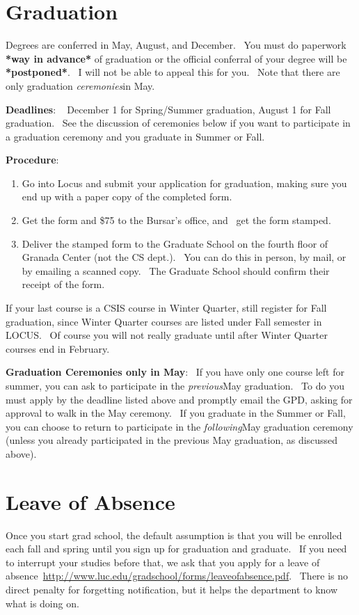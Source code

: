 \documentclass[letterpaper,10pt,english]{sphinxmanual}
\begin{document}
\section{Graduation}
\label{regulations:graduation}
Degrees are conferred in May, August, and December.  You must do
paperwork \textbf{*way in advance*} of graduation or the official conferral
of your degree will be \textbf{*postponed*}.  I will not be able to appeal
this for you.  Note that there are only graduation \emph{ceremonies}in May.

\textbf{Deadlines}:   December 1 for Spring/Summer graduation, August 1 for
Fall graduation.  See the discussion of ceremonies below if you want to
participate in a graduation ceremony and you graduate in Summer or Fall.

\textbf{Procedure}:
\begin{enumerate}
\item {} 
Go into Locus and submit your application for graduation, making sure
you end up with a paper copy of the completed form.

\item {} 
Get the form and \$75 to the Bursar's office, and  get the form
stamped.

\item {} 
Deliver the stamped form to the Graduate School on the fourth floor
of Granada Center (not the CS dept.).  You can do this in person, by
mail, or by emailing a scanned copy.  The Graduate School should
confirm their receipt of the form.

\end{enumerate}

If your last course is a CSIS course in Winter Quarter, still register
for Fall graduation, since Winter Quarter courses are listed under Fall
semester in LOCUS.  Of course you will not really graduate until after
Winter Quarter courses end in February.

\textbf{Graduation Ceremonies only in May}:  If you have only one course left
for summer, you can ask to participate in the \emph{previous}May
graduation.  To do you must apply by the deadline listed above and
promptly email the GPD, asking for approval to walk in the May
ceremony.  If you graduate in the Summer or Fall, you can choose to
return to participate in the \emph{following}May graduation ceremony
(unless you already participated in the previous May graduation, as
discussed above).


\section{Leave of Absence}
\label{regulations:leave-of-absence}
Once you start grad school, the default assumption is that you will be
enrolled each fall and spring until you sign up for graduation and
graduate.  If you need to interrupt your studies before that, we ask
that you apply for a leave of
absence \href{http://www.luc.edu/gradschool/forms/leaveofabsence.pdf}{http://www.luc.edu/gradschool/forms/leaveofabsence.pdf}.
 There is no direct penalty for forgetting notification, but it helps
the department to know what is doing on.
\end{document}
